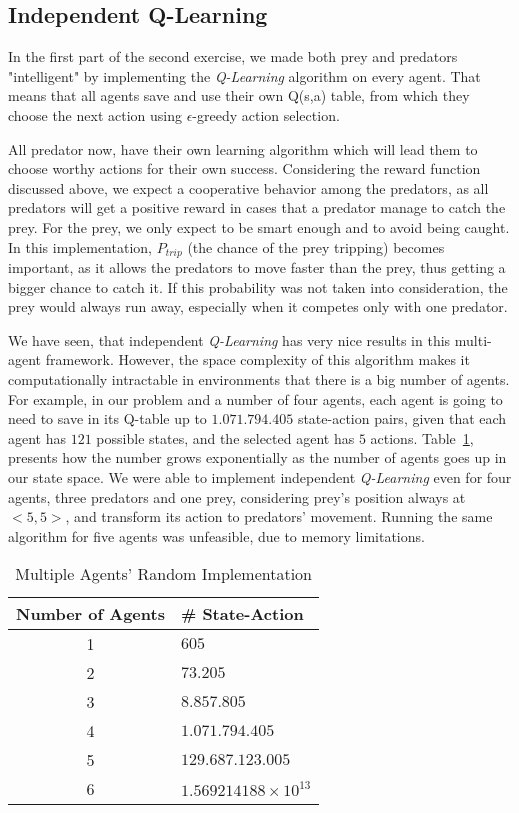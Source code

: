 \documentclass[a4paper,11pt]{article}
\begin{document}
\subsection{Independent Q-Learning}
In the first part of the second exercise, we made both prey and predators "intelligent" by implementing the \textit{Q-Learning} algorithm on every agent. That means that all agents save and use their own Q(s,a) table, from which they choose the next action using $\epsilon$-greedy action selection.

All predator now, have their own learning algorithm which will lead them to choose worthy actions for their own success. Considering the reward function discussed above, we expect a cooperative behavior among the predators, as all predators will get a positive reward in cases that a predator manage to catch the prey. For the prey, we only expect to be smart enough and to avoid being caught. In this implementation, $P_{trip}$ (the chance of the prey tripping) becomes important, as it allows the predators to move faster than the prey, thus getting a bigger chance to catch it. If this probability was not taken into consideration, the prey would always run away, especially when it competes only with one predator.

We have seen, that independent \textit{Q-Learning} has very nice results in this multi-agent framework. However, the space complexity of this algorithm makes it computationally intractable in environments that there is a big number of agents. For example, in our problem and a number of four agents, each agent is going to need to save in its Q-table up to $1.071.794.405$ state-action pairs, given that each agent has $121$ possible states, and the selected agent has $5$ actions. Table~\ref{table:complexity}, presents how the number grows exponentially as the number of agents goes up in our state space. We were able to implement independent \textit{Q-Learning} even for four agents, three predators and one prey, considering prey's position always at $<5,5>$, and transform its action to predators' movement. Running the same algorithm for five agents was unfeasible, due to memory limitations.


\begin{table}[h]
\begin{center}
\caption{Multiple Agents' Random Implementation}
\begin{tabular}{c l} 
\hline\hline               
\textbf{\small{Number of Agents}} & \textbf{\small{\# State-Action}} \\  
\hline
1 & $605$\\ 
2 & $73.205$\\
3 & $8.857.805$\\
4 & $1.071.794.405$\\
5 & $129.687.123.005$\\
6 & $1.569214188 \times 10^{13}$\\
\end{tabular}
\label{table:complexity} 
\end{center} 
\end{table} 
\end{document}

